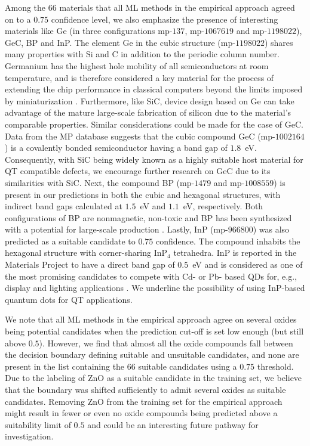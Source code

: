 \documentclass[superscriptaddress,unsortedaddress,
 amsmath,amssymb,
 aps,
]{revtex4-2}
\begin{document}
Among the $66$ materials that all ML methods in the empirical approach agreed on to a $0.75$ confidence level, we also emphasize the presence of interesting materials like Ge (in three configurations mp-$137$, mp-$1067619$ and mp-$1198022$), GeC, BP and InP. The element Ge in the cubic structure (mp-$1198022$) shares many properties with Si and C in addition to the periodic column number. 
Germanium has the highest hole mobility of all semiconductors at room temperature, and is therefore considered a key material for the process of extending the chip performance in classical computers beyond the limits imposed by miniaturization \cite{Scappucci2020}. Furthermore, like SiC, device design based on Ge can take advantage of the mature large-scale fabrication of silicon due to the material's comparable properties.  
Similar considerations could be made for the case of GeC. 
Data from the MP database suggests that the cubic compound GeC (mp-$1002164$) is a covalently bonded semiconductor having a band gap of $1.8$~eV. 
Consequently, with SiC being widely known as a highly suitable host material for QT compatible defects, we encourage further research on GeC due to its similarities with SiC. 
Next, the compound BP (mp-$1479$ and mp-$1008559$) is present in our predictions in both the cubic and hexagonal structures, with indirect band gaps calculated at $1.5$~eV and $1.1$~eV, respectively. Both configurations of BP are nonmagnetic, non-toxic and BP has been synthesized with a potential for large-scale production \cite{MukhanovVladimirA2016Umso}. 
Lastly, InP (mp-$966800$) was also predicted as a suitable candidate to $0.75$ confidence. The compound inhabits the hexagonal structure with corner-sharing InP$_4$ tetrahedra. InP is reported in the Materials Project to have a direct band gap of $0.5$~eV and is considered as one of the most promising candidates to compete with Cd- or Pb- based QDs for, e.g., display and lighting applications  \cite{Zhang2020a, Won2019}. 
We underline the possibility of using InP-based quantum dots for QT applications. 

We note that all ML methods in the empirical approach agree on several oxides being potential candidates when the prediction cut-off is set low enough (but still above $0.5$). However, we find that almost all the oxide compounds fall between the decision boundary defining suitable and unsuitable candidates, and none are present in the list containing the $66$ suitable candidates using a $0.75$ threshold. Due to the labeling of ZnO as a suitable candidate in the training set, we believe that the boundary was shifted sufficiently to admit several oxides as suitable candidates. Removing ZnO from the training set for the empirical approach might result in fewer or even no oxide compounds being predicted above a suitability limit of $0.5$ and could be an interesting future pathway for investigation. 
\end{document}
